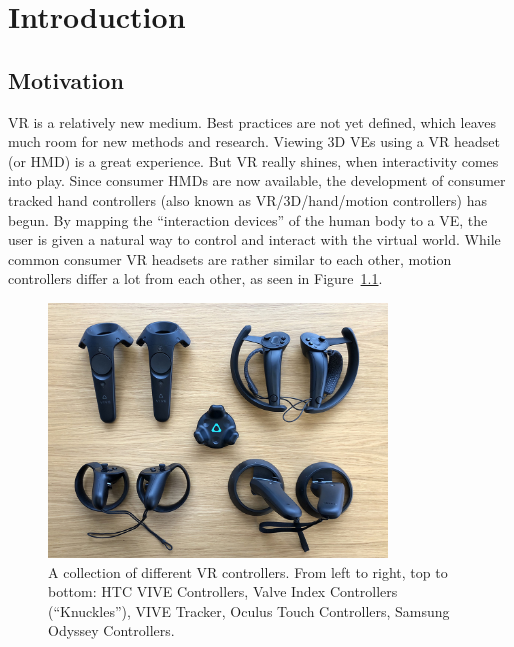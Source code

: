 \chapter{Introduction}\label{chapter:introduction}

\section{Motivation}\label{section:motivation}

\begin{sloppypar}%
  \ac{VR} is a relatively new medium. Best practices are not yet defined, which leaves much room for new methods and research. Viewing \ac{3D} \acp{VE} using a \ac{VR} headset (or \ac{HMD}) is a great experience. But \ac{VR} really shines, when interactivity comes into play. Since consumer \acp{HMD} are now available, the development of consumer tracked hand controllers (also known as \ac{VR}/\ac{3D}/hand/motion controllers) has begun. By mapping the \enquote{interaction devices} of the human body to a \ac{VE}, the user is given a natural way to control and interact with the virtual world. While common consumer \ac{VR} headsets are rather similar to each other, motion controllers differ a lot from each other, as seen in Figure~\ref{fig:vr-controllers}.
\end{sloppypar}%

\begin{figure}[H]%
  \centering%
  \includegraphics[width=9cm]{figures/vr_controllers.jpg}%
  \caption[Collection of VR controllers]{A collection of different \ac{VR} controllers. From left to right, top to bottom: HTC VIVE Controllers, Valve Index Controllers (\enquote{Knuckles}), VIVE Tracker, Oculus Touch Controllers, Samsung Odyssey Controllers.}\label{fig:vr-controllers}
\end{figure}


